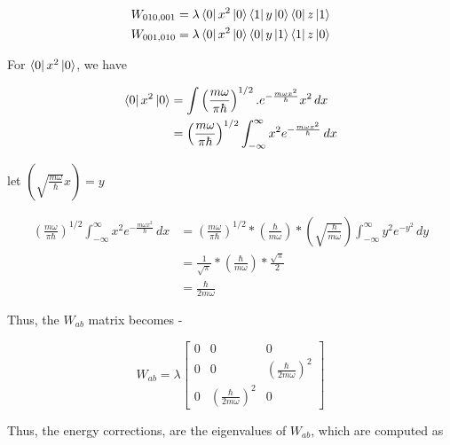     \begin{gather*}
        W_{010, 001} = \lambda\bra{0}x^2\ket{0}\bra{1}y\ket{0}\bra{0}z\ket{1} \\
        W_{001, 010} = \lambda\bra{0}x^2\ket{0}\bra{0}y\ket{1}\bra{1}z\ket{0}
    \end{gather*}

    For $\bra{0}x^2\ket{0}$, we have

    \begin{equation*}
        \begin{split}
            \bra{0}x^2\ket{0} & = \int \left( \frac{m\omega}{\pi\hbar}\right)^{1/2} . e^{-\frac{m\omega x^2}{\hbar}} x^2 \, dx \\
            & = \left( \frac{m\omega}{\pi\hbar}\right)^{1/2} \int_{-\infty}^{\infty}x^2 e^{-\frac{m\omega x^2}{\hbar}} \, dx \\
        \end{split}
    \end{equation*}

    let $\left( \sqrt{\frac{m\omega}{\hbar}} x \right) = y$

    \begin{equation*}
        \begin{split}
            \left( \frac{m\omega}{\pi\hbar}\right)^{1/2} \int_{-\infty}^{\infty}x^2 e^{-\frac{m\omega x^2}{\hbar}} \, dx & = \left( \frac{m\omega}{\pi\hbar}\right)^{1/2} * \left( \frac{\hbar}{m\omega} \right) * \left( \sqrt{\frac{\hbar}{m\omega}} \right) \int_{-\infty}^{\infty}y^2 e^{-y^2} \, dy \\
            & = \frac{1}{\sqrt{\pi}} * \left( \frac{\hbar}{m\omega} \right) * \frac{\sqrt{\pi}}{2} \\
            & = \frac{\hbar}{2m\omega}
        \end{split}
    \end{equation*}

    Thus, the $W_{ab}$ matrix becomes -

    \begin{equation*}
        W_{ab} = \lambda
        \begin{bmatrix}
            0 & 0 & 0 \\
            0 & 0 & \left( \frac{\hbar}{2m\omega} \right)^2 \\
            0 & \left( \frac{\hbar}{2m\omega} \right)^2 & 0 
        \end{bmatrix}
    \end{equation*}

    Thus, the energy corrections, are the eigenvalues of $W_{ab}$, which are computed as 

